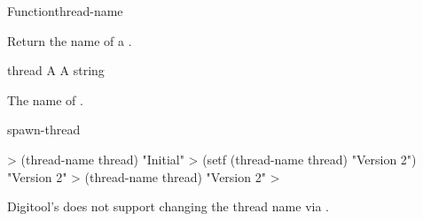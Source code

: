 \documentclass[10pt,twoside,english,pdftex]{article}
\begin{document}
\begin{functiondoc}{Function}{thread-name}{ 
    }

\fnsyntax

\fnpurpose Return the name of a .

\fnsetf
{}

\fnpackage {}

\fnmodule {}

\fnargs
\begin{args}{thread}
\arg[thread] A 
 A string
\end{args}

\fnreturns The name of .

\fnerrors
\nothreads{}

\begin{alsos}{spawn-thread}
\end{alsos}

\fnexamples
%
\W\supp
\begin{example}
  > (thread-name thread)
  "Initial"
  > (setf (thread-name thread) "Version 2")
  "Version 2"
  > (thread-name thread)
  "Version 2"
  >
\end{example}

\fnnote Digitool's 
does not support changing the thread name via .

\end{functiondoc}

\end{document}
